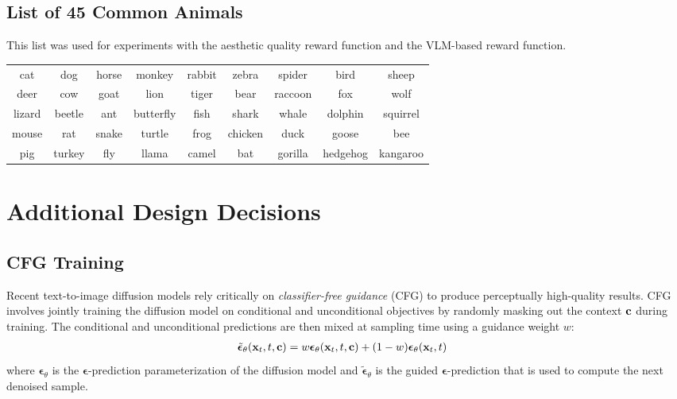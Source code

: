 \begin{appendices}
\subsection{List of 45 Common Animals}
This list was used for experiments with the aesthetic quality reward function and the VLM-based reward function.
\begin{center}
    \begin{tabular}{c|c|c|c|c|c|c|c|c}
        cat & dog & horse & monkey & rabbit & zebra & spider & bird & sheep \\
        deer & cow & goat & lion & tiger & bear & raccoon & fox & wolf \\
        lizard & beetle & ant & butterfly & fish & shark & whale & dolphin & squirrel \\
        mouse & rat & snake & turtle & frog & chicken & duck & goose & bee \\
        pig & turkey & fly & llama & camel & bat & gorilla & hedgehog & kangaroo
    \end{tabular}
\end{center}

\section{Additional Design Decisions}
\label{app:design}

\subsection{CFG Training}
Recent text-to-image diffusion models rely critically on \emph{classifier-free guidance} (CFG) \citep{ho2021classifierfree} to produce perceptually high-quality results. CFG involves jointly training the diffusion model on conditional and unconditional objectives by randomly masking out the context $\mathbf{c}$ during training. The conditional and unconditional predictions are then mixed at sampling time using a guidance weight $w$:
\begin{align}
    \tilde{\bm{\epsilon}}_\theta(\mathbf{x}_t, t, \mathbf{c}) &= w \bm{\epsilon}_\theta(\mathbf{x}_t, t, \mathbf{c}) + (1 - w) \bm{\epsilon}_\theta(\mathbf{x}_t, t)
\end{align}
where $\bm{\epsilon}_\theta$ is the $\bm{\epsilon}$-prediction parameterization of the diffusion model \citep{ho2020denoising} and $\tilde{\bm{\epsilon}}_\theta$ is the guided $\bm \epsilon$-prediction that is used to compute the next denoised sample.


\end{appendices}
